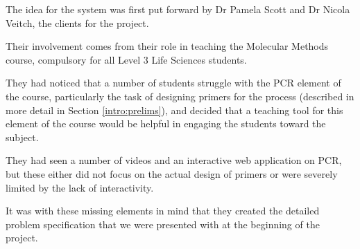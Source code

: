 The idea for the system was first put forward by Dr Pamela Scott and Dr
Nicola Veitch, the clients for the project. 

Their involvement comes from their role in teaching the Molecular Methods 
course, compulsory for all Level 3 Life Sciences students. 

They had noticed that a number of students struggle with the PCR element of the 
course, particularly the task of designing primers for the process (described in
more detail in Section \ref{intro:prelims}), and decided that a teaching tool for 
this element of the course would be helpful in engaging the students toward the 
subject. 

They had seen a number of videos and an interactive web application on PCR, but these 
either did not focus on the actual design of primers or were severely limited by the 
lack of interactivity. 

It was with these missing elements in mind that they created the detailed problem 
specification that we were presented with at the beginning of the project.




